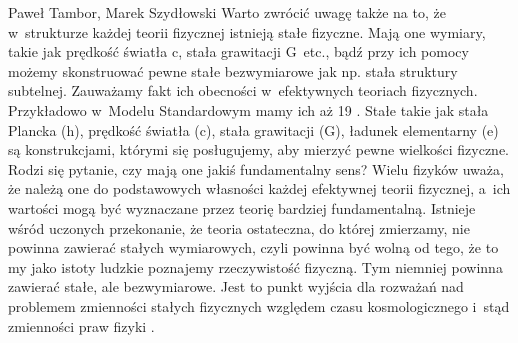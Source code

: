 \begin{artplenv2auth}{Paweł Tambor, Marek Szydłowski}
Warto zwrócić uwagę także na to, że w~strukturze każdej teorii fizycznej istnieją stałe fizyczne. Mają one wymiary, takie jak prędkość światła c, stała grawitacji G~etc., bądź przy ich pomocy możemy skonstruować pewne stałe bezwymiarowe jak np. stała struktury subtelnej. Zauważamy fakt ich obecności w~efektywnych teoriach fizycznych. Przykładowo w~Modelu Standardowym mamy ich aż 19
\parencite[][]{duff_how_2014}. %
 Stałe takie jak stała Plancka (h), prędkość światła (c), stała grawitacji (G), ładunek elementarny (e) są konstrukcjami, którymi się posługujemy, aby mierzyć pewne wielkości fizyczne. Rodzi się pytanie, czy mają one jakiś fundamentalny sens? Wielu fizyków uważa, że należą one do podstawowych własności każdej efektywnej teorii fizycznej, a~ich wartości mogą być wyznaczane przez teorię bardziej fundamentalną. Istnieje wśród uczonych przekonanie, że teoria ostateczna, do której zmierzamy, nie powinna zawierać stałych wymiarowych, czyli powinna być wolną od tego, że to my jako istoty ludzkie poznajemy rzeczywistość fizyczną. Tym niemniej powinna zawierać stałe, ale bezwymiarowe. Jest to punkt wyjścia dla rozważań nad problemem zmienności stałych fizycznych względem czasu kosmologicznego i~stąd zmienności praw fizyki 
\parencite[][]{volovik_fundamental_2002}.%



\end{artplenv2auth}
